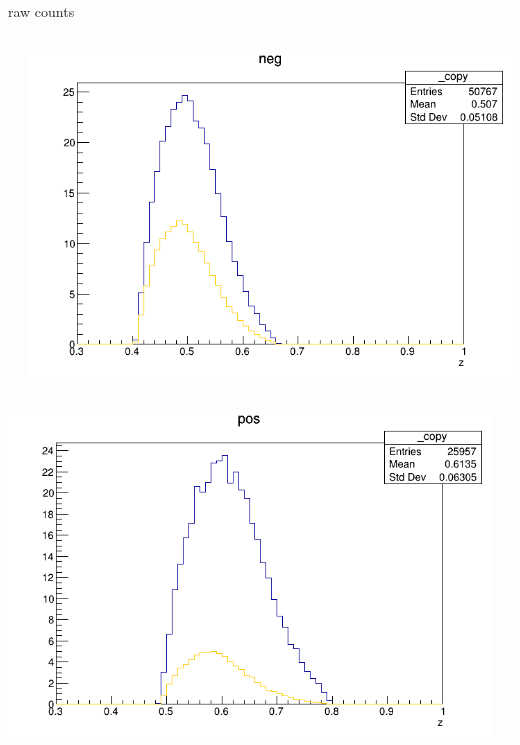 \begin{frame}{raw counts}
\begin{columns}
\begin{column}[T]{0.25\textwidth}
\end{column}
\begin{column}[T]{0.25\textwidth}
\includegraphics[width = \textwidth]{results/yield/statistics/yield_x_Q2_z_0.45_3.898_0.50_neg.png}
\end{column}
\end{columns}
\begin{columns}
\begin{column}[T]{0.25\textwidth}
\includegraphics[width = \textwidth]{results/yield/statistics/yield_x_Q2_z_0.45_3.898_0.60_pos.png}
\end{column}
\begin{column}[T]{0.25\textwidth}

\end{column}
\end{columns}
\end{frame}
